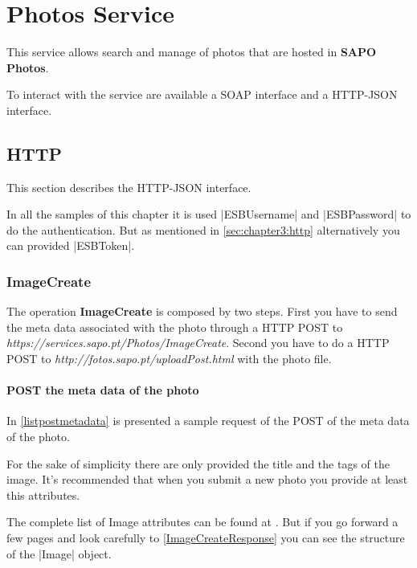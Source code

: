 \chapter{Photos Service}
\label{sec:chapter4}

This service allows search and manage of photos that are hosted in \textbf{SAPO Photos}. 

To interact with the service are available a SOAP interface and a HTTP-JSON interface.

\section{HTTP}
\label{sec:chapter4:http}

This section describes the HTTP-JSON interface.

In all the samples of this chapter it is used \icode|ESBUsername| and \icode|ESBPassword| to do the authentication. But as mentioned in \autoref{sec:chapter3:http} alternatively you can provided \icode|ESBToken|. 

\subsection{ImageCreate}
\label{sec:chapter4:photos:http:imagecreate}

The operation \textbf{ImageCreate} is composed by two steps. First you have to send the meta data associated with the photo through a HTTP POST to \textit{https://services.sapo.pt/Photos/ImageCreate}. Second you have to do a HTTP POST to \textit{http://fotos.sapo.pt/uploadPost.html} with the photo file.

\subsubsection{POST the meta data of the photo}
\label{sec:chapter4:photos:http:imagecreate:metadata}

In \autoref{listpostmetadata} is presented a sample request of the POST of the meta data of the photo.

For the sake of simplicity there are only provided the title and the tags of the image. It's recommended that when you submit a new photo you provide at least this attributes.

The complete list of Image attributes can be found at \cite{photosimage}. But if you go forward a few pages and look carefully to \autoref{ImageCreateResponse} you can see the structure of the \icode|Image| object.

